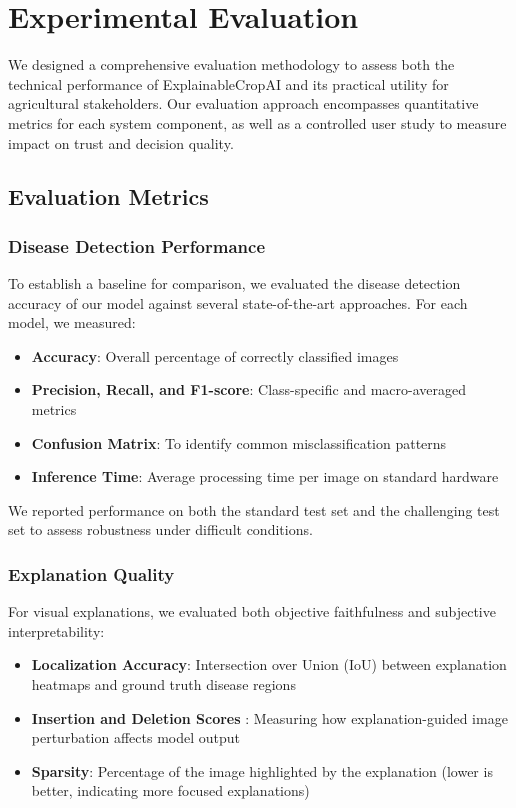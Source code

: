 \section{Experimental Evaluation}

We designed a comprehensive evaluation methodology to assess both the technical performance of ExplainableCropAI and its practical utility for agricultural stakeholders. Our evaluation approach encompasses quantitative metrics for each system component, as well as a controlled user study to measure impact on trust and decision quality.

\subsection{Evaluation Metrics}

\subsubsection{Disease Detection Performance}

To establish a baseline for comparison, we evaluated the disease detection accuracy of our model against several state-of-the-art approaches. For each model, we measured:

\begin{itemize}
    \item \textbf{Accuracy}: Overall percentage of correctly classified images
    \item \textbf{Precision, Recall, and F1-score}: Class-specific and macro-averaged metrics
    \item \textbf{Confusion Matrix}: To identify common misclassification patterns
    \item \textbf{Inference Time}: Average processing time per image on standard hardware
\end{itemize}

We reported performance on both the standard test set and the challenging test set to assess robustness under difficult conditions.

\subsubsection{Explanation Quality}

For visual explanations, we evaluated both objective faithfulness and subjective interpretability:

\begin{itemize}
    \item \textbf{Localization Accuracy}: Intersection over Union (IoU) between explanation heatmaps and ground truth disease regions
    \item \textbf{Insertion and Deletion Scores} \cite{petsiuk2018rise}: Measuring how explanation-guided image perturbation affects model output
    \item \textbf{Sparsity}: Percentage of the image highlighted by the explanation (lower is better, indicating more focused explanations)
\end{itemize}

